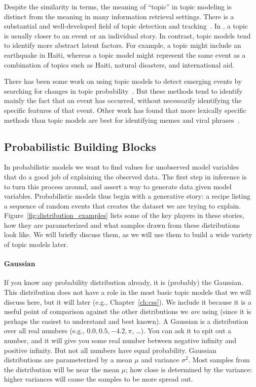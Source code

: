 Despite the similarity in terms, the meaning of ``topic'' in topic modeling is distinct from the meaning in many information retrieval settings.
There is a substantial and well-developed field of topic detection and tracking~\citep{allan-02}.
In , a topic is usually closer to an event or an individual story.
In contrast, topic models tend to identify more abstract latent factors.
For example, a  topic might include an earthquake in Haiti, whereas a topic model might represent the same event as a combination of topics such as Haiti, natural disasters, and international aid.

There has been some work on using topic models to detect emerging events by searching for changes in topic probability~\citep{alsumait-08}.
But these methods tend to identify mainly the fact that an event has occurred, without necessarily identifying the specific features of that event.
Other work has found that more lexically specific methods than topic
models are best for identifying memes and viral
phrases~\citep{leskovec-09}. \\


\subsection{Probabilistic Building Blocks}
\label{sec:intro_building_blocks}

In probabilistic models we want to find values for unobserved model variables that do a good job of explaining the observed data.
The first step in inference is to turn this process around, and assert a way to generate data given model variables.
Probabilistic models thus begin with a generative story: a recipe listing a sequence of random events
that creates the dataset we are trying to explain.
Figure~\ref{fig:distribution_examples} lists some of the key players in these
stories, how they are parameterized and what samples drawn from these distributions look like.  We will
briefly discuss them, as we will use them to build a wide variety of topic models later.

\paragraph{Gaussian} If you know any probability distribution already,
it is (probably) the
Gaussian.  This distribution does not have a role in the most basic topic models that we will
discuss here, but it will later (e.g., Chapter~\ref{ch:css}).  We
include it because it is a useful point of comparison against the other
distributions we {\em are} using (since it is perhaps the easiest to understand and best
known). A Gaussian is a distribution over all real numbers (e.g., $0.0, 0.5,
-4.2, \pi$, \dots).  You can ask it to spit out a number, and it will give you
some real number between negative infinity and positive infinity.  But not all
numbers have equal probability.  Gaussian distributions are parameterized by a
mean $\mu$ and variance $\sigma^2$.  Most samples from the distribution will be
near the mean $\mu$; how close is determined by the variance: higher variances
will cause the samples to be more spread out.

